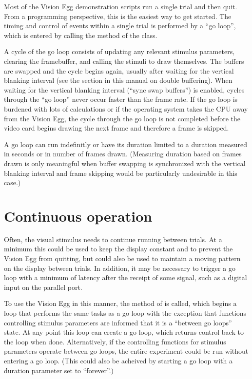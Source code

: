 \documentclass{manual}
\begin{document}
Most of the Vision Egg demonstration scripts run a single trial and
then quit. From a programming perspective, this is the easiest way to
get started. The timing and control of events within a single trial is
performed by a ``go loop'', which is entered by calling the
 method of the  class.

A cycle of the go loop consists of updating any relevant stimulus
parameters, clearing the framebuffer, and calling the stimuli to draw
themselves.  The buffers are swapped and the cycle begins again,
usually after waiting for the vertical blanking interval (see the
section in this manual on double buffering).  When waiting for the
vertical blanking interval (``sync swap buffers'') is enabled, cycles
through the ``go loop'' never occur faster than the frame rate.  If
the go loop is burdened with lots of calculations or if the operating
system takes the CPU away from the Vision Egg, the cycle through the
go loop is not completed before the video card begins drawing the next
frame and therefore a frame is skipped.

A go loop can run indefinitly or have its duration limited to a
duration measured in seconds or in number of frames drawn.  (Measuring
duration based on frames drawn is only meaningful when buffer swapping
is synchronized with the vertical blanking interval and frame skipping
would be particularly undesirable in this case.)

\section{Continuous operation}

Often, the visual stimulus needs to continue running between trials.
At a minimum this could be used to keep the display constant and to
prevent the Vision Egg from quitting, but could also be used to
maintain a moving pattern on the display between trials.  In addition,
it may be necessary to trigger a go loop with a minimum of latency
after the receipt of some signal, such as a digital input on the
parallel port.

To use the Vision Egg in this manner, the 
method of  is called, which begins a loop that
performs the same tasks as a go loop with the exception that functions
controlling stimulus parameters are informed that it is a ``between go
loops'' state.  At any point this  loop can create
a go loop, which returns control back to the  loop
when done.  Alternatively, if the controlling functions for stimulus
parameters operate between go loops, the entire experiment could be
run without entering a go loop.  (This could also be acheived by
starting a go loop with a duration parameter set to ``forever''.)
\end{document}

